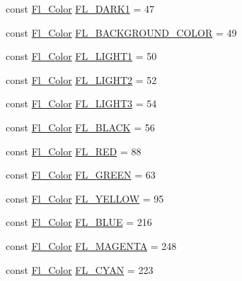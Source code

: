 \begin{DoxyCompactItemize}
const \hyperlink{_enumerations_8_h_a8b762953646f8abee866061f1af78a6a}{Fl\+\_\+\+Color} \hyperlink{_enumerations_8_h_a2b6668e03d46f67a3ebeb6fc4713de4a}{F\+L\+\_\+\+D\+A\+R\+K1} = 47
\item 
const \hyperlink{_enumerations_8_h_a8b762953646f8abee866061f1af78a6a}{Fl\+\_\+\+Color} \hyperlink{_enumerations_8_h_aa1c7250c485966fcd5c49f1bdc3a6587}{F\+L\+\_\+\+B\+A\+C\+K\+G\+R\+O\+U\+N\+D\+\_\+\+C\+O\+L\+OR} = 49
\item 
const \hyperlink{_enumerations_8_h_a8b762953646f8abee866061f1af78a6a}{Fl\+\_\+\+Color} \hyperlink{_enumerations_8_h_ab3a99b5be2f1cd0bd5d4b0bd723d1d31}{F\+L\+\_\+\+L\+I\+G\+H\+T1} = 50
\item 
const \hyperlink{_enumerations_8_h_a8b762953646f8abee866061f1af78a6a}{Fl\+\_\+\+Color} \hyperlink{_enumerations_8_h_a186273e1025db07389a99cf29ac81493}{F\+L\+\_\+\+L\+I\+G\+H\+T2} = 52
\item 
const \hyperlink{_enumerations_8_h_a8b762953646f8abee866061f1af78a6a}{Fl\+\_\+\+Color} \hyperlink{_enumerations_8_h_a1195306dc5887618e4ddea48c14da4ef}{F\+L\+\_\+\+L\+I\+G\+H\+T3} = 54
\item 
const \hyperlink{_enumerations_8_h_a8b762953646f8abee866061f1af78a6a}{Fl\+\_\+\+Color} \hyperlink{_enumerations_8_h_a705ea07a3ad2b7e3b7745c9c3c651bba}{F\+L\+\_\+\+B\+L\+A\+CK} = 56
\item 
const \hyperlink{_enumerations_8_h_a8b762953646f8abee866061f1af78a6a}{Fl\+\_\+\+Color} \hyperlink{_enumerations_8_h_a3bba4191a4612c60d9b8a354815a800b}{F\+L\+\_\+\+R\+ED} = 88
\item 
const \hyperlink{_enumerations_8_h_a8b762953646f8abee866061f1af78a6a}{Fl\+\_\+\+Color} \hyperlink{_enumerations_8_h_aed4198cc557c77e6a3a0d2ab243caf8f}{F\+L\+\_\+\+G\+R\+E\+EN} = 63
\item 
const \hyperlink{_enumerations_8_h_a8b762953646f8abee866061f1af78a6a}{Fl\+\_\+\+Color} \hyperlink{_enumerations_8_h_a22718da4ee9f26f647d93720a4927c77}{F\+L\+\_\+\+Y\+E\+L\+L\+OW} = 95
\item 
const \hyperlink{_enumerations_8_h_a8b762953646f8abee866061f1af78a6a}{Fl\+\_\+\+Color} \hyperlink{_enumerations_8_h_a9fab9562bef18bcf13f1b827b38a4ba9}{F\+L\+\_\+\+B\+L\+UE} = 216
\item 
const \hyperlink{_enumerations_8_h_a8b762953646f8abee866061f1af78a6a}{Fl\+\_\+\+Color} \hyperlink{_enumerations_8_h_a10c1bb0d1e91fee355084dcdebb4bf96}{F\+L\+\_\+\+M\+A\+G\+E\+N\+TA} = 248
\item 
const \hyperlink{_enumerations_8_h_a8b762953646f8abee866061f1af78a6a}{Fl\+\_\+\+Color} \hyperlink{_enumerations_8_h_a477aefad449ce8753aec45df51e7c896}{F\+L\+\_\+\+C\+Y\+AN} = 223

\end{DoxyCompactItemize}
